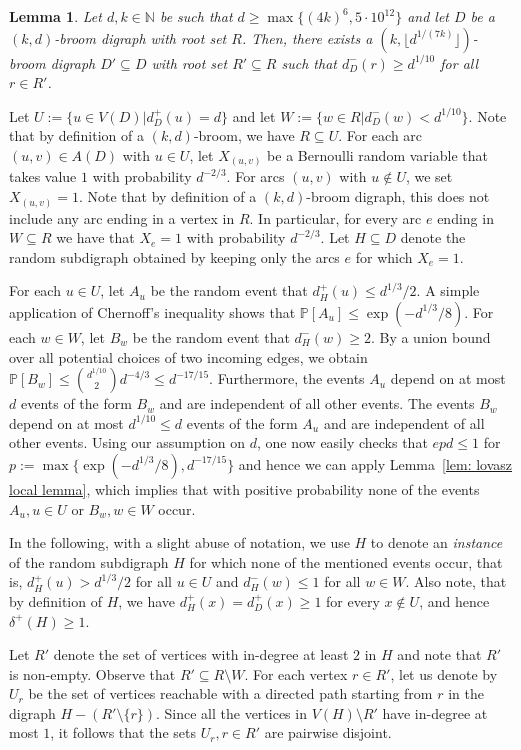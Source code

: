 \documentclass[a4paper,11pt]{article}
\makeatletter
\renewenvironment{proof}[1][\proofname] {\par\pushQED{\qed}\normalfont\topsep6\p@\@plus6\p@\relax\trivlist\item[\hskip\labelsep\bfseries#1\@addpunct{.}]\ignorespaces}{\popQED\endtrivlist\@endpefalse}
\newtheorem{lemma}[theorem]{\bf Lemma}
\theoremstyle{definition}
\makeatother
\begin{document}
\begin{lemma}\label{lem: lovasz trick}
    Let $d,k\in \mathbb{N}$ be such that $d\ge \max\{(4k)^6,5\cdot 10^{12}\}$ and let $D$ be a $(k,d)$-broom digraph with root set $R$. Then, there exists a $(k,\lfloor d^{1/(7k)}\rfloor)$-broom digraph $D'\subseteq D$ with root set $R'\subseteq R$ such that $d^{-}_D(r)\geq d^{1/10}$ for all $r\in R'$.
\end{lemma}
\begin{proof}
    Let $U:=\{u\in V(D)|d_D^+(u)=d\}$ and let $W:=\{w\in R|d_D^-(w)<d^{1/10}\}$. Note that by definition of a $(k,d)$-broom, we have $R\subseteq U$. For each arc $(u,v)\in A(D)$ with $u\in U$, let $X_{(u,v)}$ be a Bernoulli random variable that takes value $1$ with probability $d^{-2/3}$. For arcs $(u,v)$ with $u\notin U$, we set $X_{(u,v)}=1$. Note that by definition of a $(k,d)$-broom digraph, this does not include any arc ending in a vertex in $R$. In particular, for every arc $e$ ending in $W\subseteq R$ we have that $X_e=1$ with probability $d^{-2/3}$. Let $H\subseteq D$ denote the random subdigraph obtained by keeping only the arcs $e$ for which $X_e=1$.
    
    For each $u\in U$, let $A_u$ be the random event that $d^+_{H}(u)\leq d^{1/3}/2$. A simple application of Chernoff's inequality shows that $\mathbb{P}[A_u]\le \exp(-d^{1/3}/8)$. For each $w\in W$, let $B_w$ be the random event that $d^-_H(w)\geq 2$. By a union bound over all potential choices of two incoming edges, we obtain $\mathbb{P}[B_w]\le \binom{d^{1/10}}{2}d^{-4/3}\leq d^{-17/15}$. Furthermore, the events $A_u$ depend on at most $d$ events of the form $B_w$ and are independent of all other events. The events $B_w$ depend on at most $d^{1/10}\leq d$ events of the form $A_u$ and are independent of all other events. Using our assumption on $d$, one now easily checks that $epd\le 1$ for $p:=\max\{\exp(-d^{1/3}/8), d^{-17/15}\}$ and hence we can apply Lemma~\ref{lem: lovasz local lemma}, which implies that with positive probability none of the events $A_u, u\in U$ or $B_w, w \in W$ occur. 
    
    In the following, with a slight abuse of notation, we use $H$ to denote an \emph{instance} of the random subdigraph $H$ for which none of the mentioned events occur, that is, $d_H^+(u)>d^{1/3}/2$ for all $u\in U$ and $d_H^-(w)\le 1$ for all $w\in W$. Also note, that by definition of $H$, we have $d_H^+(x)=d_D^+(x)\ge 1$ for every $x\notin U$, and hence $\delta^+(H)\ge 1$.

    Let $R'$ denote the set of vertices with in-degree at least $2$ in $H$ and note that $R'$ is non-empty. Observe that $R'\subseteq R\setminus W$. For each vertex $r\in R'$, let us denote by $U_r$ be the set of vertices reachable with a directed path starting from $r$ in the digraph $H-(R'\setminus\{r\})$. Since all the vertices in $V(H)\setminus R'$ have in-degree at most $1$, it follows that the sets $U_r, r\in R'$ are pairwise disjoint. 
    

\end{proof}
\end{document}
